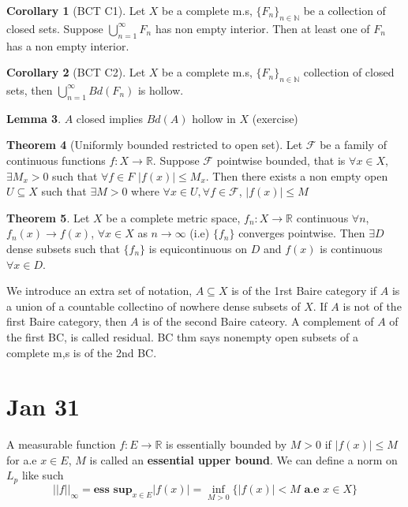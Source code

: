 \documentclass[12pt]{article}
\theoremstyle{definition}
\newtheorem{theorem}{Theorem}[section]
\newtheorem{lemma}[theorem]{Lemma}
\newtheorem{corollary}[theorem]{Corollary}
\begin{document}
	\begin{corollary}[BCT C1]
		Let $X$ be a complete m.s, $\{F_n\}_{n \in \mathbb{N}}$ be a collection of closed sets. Suppose $\bigcup_{n=1}^\infty F_n$ has non empty interior. Then at least one of $F_n$ has a non empty interior.		
	\end{corollary}
	\begin{corollary}[BCT C2]
		Let $X$ be a complete m.s, $\{F_n\}_{n \in \mathbb{N}}$ collection of closed sets, then $\bigcup_{n=1}^\infty Bd(F_n)$ is hollow.

	\end{corollary}
	\begin{lemma}
		$A$ closed implies $Bd(A)$ hollow in $X$ (exercise)	
	\end{lemma}
	\begin{theorem}[Uniformly bounded restricted to open set]
		Let $\mathcal{F}$ be a family of continuous functions $f \colon X \to \mathbb{R}$. Suppose $\mathcal{F}$ pointwise bounded, that is $\forall x \in X$, $\exists M_x > 0$ such that $\forall f \in F$ $|f(x)| \leq M_x$. Then there exists a non empty open $U \subseteq X$ such that $\exists M > 0$ where $\forall x \in U, \forall f \in \mathcal{F}$, $|f(x)| \leq M$ 
	\end{theorem}

	\begin{theorem}
		Let $X$ be a complete metric space, $f_n \colon X\to \mathbb{R}$ continuous $\forall n$, $f_n(x) \to f(x)$, $\forall x \in X$ as $n \to \infty$ (i.e) $\{f_n\}$ converges pointwise. Then $\exists D$ dense subsets such that $\{f_n\}$ is equicontinuous on $D$ and $f(x)$ is continuous $\forall x \in D$. 	
	\end{theorem}
	We introduce an extra set of notation, $A \subseteq X$ is of the 1rst Baire category if $A$ is a union of a countable collectino of nowhere dense subsets of $X$. If $A$ is not of the first Baire category, then $A$ is of the second Baire cateory. A complement of $A$ of the first BC, is called residual. BC thm says nonempty open subsets of a complete m,s is of the 2nd BC. 


	\section*{Jan 31}
	A measurable function $f \colon E \to \mathbb{R}$ is essentially bounded by $M > 0$ if $|f(x)| \leq M$ for a.e $x \in E$, $M$ is called an \textbf{essential upper bound}. 
	We can define a norm on $L_p$ like such
	$$||f||_{\infty} = \textbf{ess sup}_{x \in E} |f(x)| = \inf_{M > 0} \{|f(x)| < M \textbf{ a.e $x \in X$}\}$$
\end{document}
